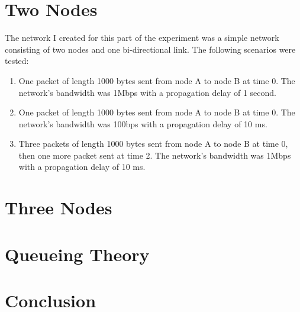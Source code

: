 \documentclass[11pt]{article}
\begin{document}
\section{Two Nodes}

The network I created for this part of the experiment was a simple network consisting of two nodes and one bi-directional link. The following scenarios were tested:

\begin{enumerate}

\item One packet of length 1000 bytes sent from node A to node B at time 0. The network's bandwidth was 1Mbps with a propagation delay of 1 second.

\item One packet of length 1000 bytes sent from node A to node B at time 0. The network's bandwidth was 100bps with a propagation delay of 10 ms.

\item Three packets of length 1000 bytes sent from node A to node B at time 0, then one more packet sent at time 2. The network's bandwidth was 1Mbps with a propagation delay of 10 ms.

\end{enumerate}

\section{Three Nodes}

\section{Queueing Theory}

\section{Conclusion}
\end{document}
